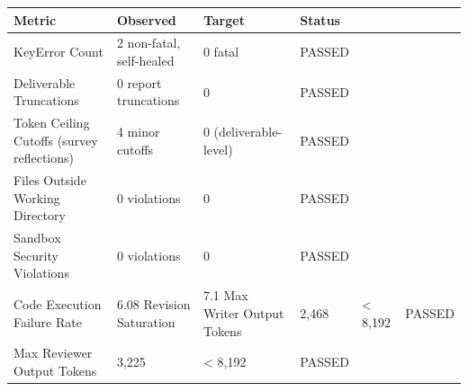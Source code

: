 \begin{tabular}{p{4.5cm}p{5cm}p{3cm}p{2cm}}
\toprule
Metric & Observed & Target & Status \\
\midrule
KeyError Count & 2 non-fatal, self-healed & 0 fatal & PASSED \\
Deliverable Truncations & 0 report truncations & 0 & PASSED \\
Token Ceiling Cutoffs (survey reflections) & 4 minor cutoffs & 0 (deliverable-level) & PASSED \\
Files Outside Working Directory & 0 violations & 0 & PASSED \\
Sandbox Security Violations & 0 violations & 0 & PASSED \\
Code Execution Failure Rate & 6.08%
Revision Saturation & 7.1%
Max Writer Output Tokens & 2,468 & < 8,192 & PASSED \\
Max Reviewer Output Tokens & 3,225 & < 8,192 & PASSED \\
\bottomrule
\end{tabular}
